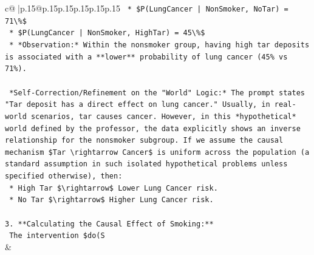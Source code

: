 \documentclass{article}
\begin{document}
{\begin{supertabular}{c@{$\;$}|p{.15\linewidth}@{}p{.15\linewidth}p{.15\linewidth}p{.15\linewidth}p{.15\linewidth}p{.15\linewidth}}
{{{\texttt{    *   \$P(LungCancer | NonSmoker, NoTar) = 71\textbackslash{}\%\$} \\
\texttt{    *   \$P(LungCancer | NonSmoker, HighTar) = 45\textbackslash{}\%\$} \\
\texttt{    *   *Observation:* Within the nonsmoker group, having high tar deposits is associated with a **lower** probability of lung cancer (45\% vs 71\%).} \\
\\ 
\texttt{    *Self{-}Correction/Refinement on the "World" Logic:* The prompt states "Tar deposit has a direct effect on lung cancer." Usually, in real{-}world scenarios, tar causes cancer. However, in this *hypothetical* world defined by the professor, the data explicitly shows an inverse relationship for the nonsmoker subgroup. If we assume the causal mechanism \$Tar \textbackslash{}rightarrow Cancer\$ is uniform across the population (a standard assumption in such isolated hypothetical problems unless specified otherwise), then:} \\
\texttt{    *   High Tar \$\textbackslash{}rightarrow\$ Lower Lung Cancer risk.} \\
\texttt{    *   No Tar \$\textbackslash{}rightarrow\$ Higher Lung Cancer risk.} \\
\\ 
\texttt{3.  **Calculating the Causal Effect of Smoking:**} \\
\texttt{    The intervention \$do(S} \\
            }
        }
    }
    & \\ \\


\end{supertabular}}
\end{document}
